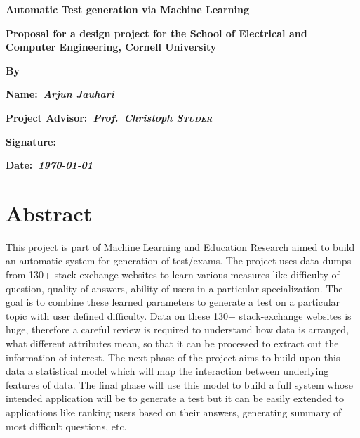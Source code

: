 \documentclass{article}
\begin{document}
\begin{titlepage}
	\centering
	{\LARGE\bfseries Automatic Test generation via Machine Learning \par}
	\vspace{4.5cm}
	{\Large\bfseries Proposal for a design project for the School of Electrical
and Computer Engineering, Cornell University\par}
	\vspace{1.5cm}
	{\large\bfseries By\par}
	\vspace{3cm}
    \flushleft
    {\Large\bfseries Name:~\itshape Arjun Jauhari\par}
	\vspace{0.5cm}
    {\Large\bfseries Project Advisor:~\itshape Prof.~Christoph \textsc{Studer}\par}
	\vspace{0.5cm}
    {\Large\bfseries Signature: \par}
	\vspace{0.5cm}
    {\Large\bfseries Date:~\itshape \today\par}
\end{titlepage}

\section{Abstract}
This project is part of Machine Learning and Education Research aimed to
build an automatic system for generation of test/exams. The project uses 
data dumps from 130+ stack-exchange websites to learn various measures
like difficulty of question, quality of answers, ability of users in a particular 
specialization. The goal is to combine these learned parameters to generate a test on
a particular topic with user defined difficulty. Data on these 130+ stack-exchange
websites is huge, therefore a careful review is required to understand how data 
is arranged, what different attributes mean, so that it can be processed to 
extract out the information of interest. The next phase of the project aims 
to build upon this data a statistical model which will map the interaction
between underlying features of data. The final phase will use this model
to build a full system whose intended application will be to generate a test but
it can be easily extended to applications like ranking users based on their answers,
generating summary of most difficult questions, etc.\\
\end{document}
